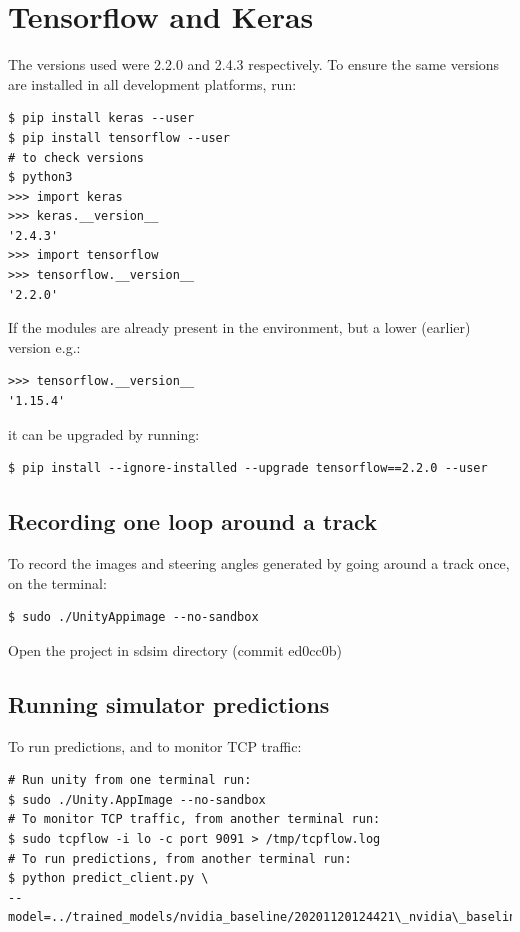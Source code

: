 \section{Tensorflow and Keras}
\label{methods:tensorflow-keras}
The versions used were 2.2.0 and 2.4.3 respectively. To ensure the same versions are installed in all development platforms, run:
\begin{verbatim}
$ pip install keras --user
$ pip install tensorflow --user
# to check versions
$ python3
>>> import keras
>>> keras.__version__
'2.4.3'
>>> import tensorflow
>>> tensorflow.__version__
'2.2.0'
\end{verbatim}
If the modules are already present in the environment, but a lower (earlier) version e.g.:
\begin{verbatim}
>>> tensorflow.__version__
'1.15.4'    
\end{verbatim}
it can be upgraded by running:
\begin{verbatim}
$ pip install --ignore-installed --upgrade tensorflow==2.2.0 --user
\end{verbatim}

\subsection{Recording one loop around a track}

To record the images and steering angles generated by going around a track once, on the terminal:
\begin{verbatim}
$ sudo ./UnityAppimage --no-sandbox
\end{verbatim}
Open the project in sdsim directory (commit ed0cc0b)

\subsection{Running simulator predictions}
\label{running-simulator-predictions}

To run predictions, and to monitor TCP traffic:
\begin{verbatim}
# Run unity from one terminal run:
$ sudo ./Unity.AppImage --no-sandbox
# To monitor TCP traffic, from another terminal run:
$ sudo tcpflow -i lo -c port 9091 > /tmp/tcpflow.log
# To run predictions, from another terminal run:
$ python predict_client.py \
--model=../trained_models/nvidia_baseline/20201120124421\_nvidia\_baseline.h5
\end{verbatim}

